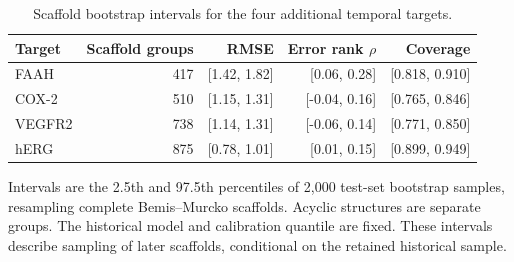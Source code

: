 \begin{table}[htbp]
\centering
\caption{Scaffold bootstrap intervals for the four additional temporal targets.}
\label{tab:extension-temporal-intervals}
\small
\begin{tabular}{lrrrr}
\toprule
Target & Scaffold groups & RMSE & Error rank $\rho$ & Coverage \\
\midrule
FAAH & 417 & [1.42, 1.82] & [0.06, 0.28] & [0.818, 0.910] \\
COX-2 & 510 & [1.15, 1.31] & [-0.04, 0.16] & [0.765, 0.846] \\
VEGFR2 & 738 & [1.14, 1.31] & [-0.06, 0.14] & [0.771, 0.850] \\
hERG & 875 & [0.78, 1.01] & [0.01, 0.15] & [0.899, 0.949] \\
\bottomrule
\end{tabular}
\par\smallskip
\begin{minipage}{0.98\linewidth}\footnotesize Intervals are the 2.5th and 97.5th percentiles of 2,000 test-set bootstrap samples, resampling complete Bemis--Murcko scaffolds. Acyclic structures are separate groups. The historical model and calibration quantile are fixed. These intervals describe sampling of later scaffolds, conditional on the retained historical sample.\end{minipage}
\end{table}
